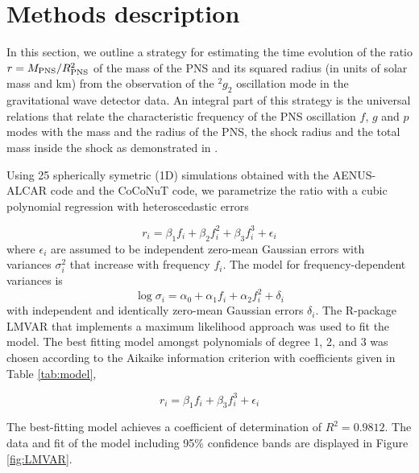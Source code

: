 \section{Methods description}
\label{methods}

In this section, we outline a strategy for estimating the time evolution of the
ratio $r=M_{\rm PNS}/R_{\rm PNS}^2$ of the mass of the PNS and its squared radius
(in units of solar mass and km) from the observation of the $\mbox{}^2g_2$
oscillation mode in the gravitational wave detector data.
An integral part of this strategy is the universal relations that relate the
characteristic frequency of the PNS oscillation $f$, $g$ and $p$ modes with the mass
and the radius of the PNS, the shock radius and the total mass inside the shock as
demonstrated in \cite{Torres:2019}.

Using 25 spherically symetric (1D) simulations obtained with the {\sc AENUS-ALCAR }code \citep{Just_et_al__2015__mnras__Anewmultidimensionalenergy-dependenttwo-momenttransportcodeforneutrino-hydrodynamics} and the
{\sc CoCoNuT} \citep{Cerda-Duran__2008__AA__GRMHD-code} code, we parametrize the ratio with a cubic polynomial
regression with heteroscedastic errors

\begin{equation}
r_i=\beta_1 f_i + \beta_2 f_i^2 +\beta_3 f_i^3 + \epsilon_i
\end{equation}
where $\epsilon_i$ are assumed to be independent zero-mean Gaussian errors with
variances $\sigma_i^2$ that increase with frequency $f_i$. The model for frequency-dependent
variances is
\begin{equation}
\log \sigma_i=\alpha_0+ \alpha_1 f_i + \alpha_2 f_i^2 + \delta_i
\end{equation}
with independent and identically zero-mean Gaussian errors $\delta_i$. The R-package LMVAR
\cite{lmvar:2019} that implements a maximum likelihood approach was used to fit the model.
The best fitting model amongst polynomials of degree 1, 2, and 3  was chosen according to
the Aikaike information criterion with coefficients given in Table \ref{tab:model},

\begin{equation}\label{eq:universal}
r_i = \beta_1 f_i + \beta_3 f_i^3 + \epsilon_i
\end{equation}

The best-fitting model achieves a coefficient of determination of $R^2=0.9812$.
The data and fit of the model including 95\% confidence bands are displayed in
Figure \ref{fig:LMVAR}.

